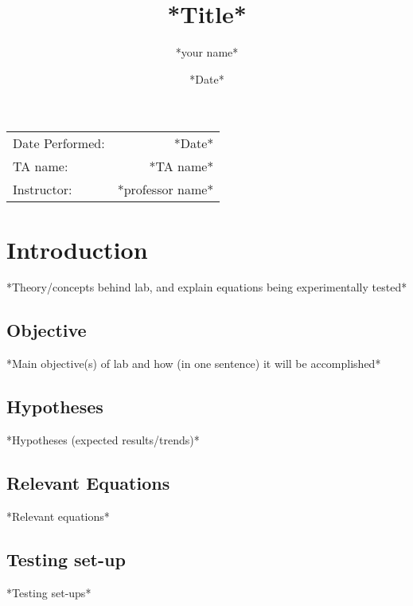 \documentclass[
	letterpaper, %
	10pt, %
]{labby boi}
\title{*Title*
} %
\author{*your name*} %
\date{*Date*} %
\begin{document}
\maketitle %

\begin{center}
	\begin{tabular}{l r}
		Date Performed: & *Date* \\ %
		TA name: & *TA name* \\ %
		Instructor: & *professor name* %
	\end{tabular}
\end{center}



\vspace{6.25in}%

\section{Introduction}
*Theory/concepts behind lab, and explain equations being experimentally tested*
\subsection{Objective}
*Main objective(s) of lab and how (in one sentence) it will be accomplished*\\
\subsection{Hypotheses}
*Hypotheses (expected results/trends)*
\subsection{Relevant Equations}
*Relevant equations*
\subsection{Testing set-up}
*Testing set-ups*
\end{document}
